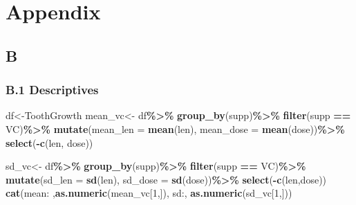 \documentclass[
]{article}
\newenvironment{Shaded}{\begin{snugshade}}{\end{snugshade}}
\newcommand{\AttributeTok}[1]{\textcolor[rgb]{0.13,0.29,0.53}{#1}}
\newcommand{\DecValTok}[1]{\textcolor[rgb]{0.00,0.00,0.81}{#1}}
\newcommand{\FunctionTok}[1]{\textcolor[rgb]{0.13,0.29,0.53}{\textbf{#1}}}
\newcommand{\NormalTok}[1]{#1}
\newcommand{\OtherTok}[1]{\textcolor[rgb]{0.56,0.35,0.01}{#1}}
\newcommand{\SpecialCharTok}[1]{\textcolor[rgb]{0.81,0.36,0.00}{\textbf{#1}}}
\newcommand{\StringTok}[1]{\textcolor[rgb]{0.31,0.60,0.02}{#1}}
\begin{document}
\section{Appendix}\label{appendix}

\subsection{B}\label{b}

\subsubsection{B.1 Descriptives}\label{b.1-descriptives}

\begin{Shaded}
\begin{Highlighting}[]
\NormalTok{df}\OtherTok{\textless{}{-}}\NormalTok{ToothGrowth}
\NormalTok{mean\_vc}\OtherTok{\textless{}{-}}
\NormalTok{    df}\SpecialCharTok{\%\textgreater{}\%}
    \FunctionTok{group\_by}\NormalTok{(supp)}\SpecialCharTok{\%\textgreater{}\%}
    \FunctionTok{filter}\NormalTok{(supp }\SpecialCharTok{==} \StringTok{\textquotesingle{}VC\textquotesingle{}}\NormalTok{)}\SpecialCharTok{\%\textgreater{}\%}
    \FunctionTok{mutate}\NormalTok{(}\AttributeTok{mean\_len =} \FunctionTok{mean}\NormalTok{(len), }\AttributeTok{mean\_dose =} \FunctionTok{mean}\NormalTok{(dose))}\SpecialCharTok{\%\textgreater{}\%}
    \FunctionTok{select}\NormalTok{(}\SpecialCharTok{{-}}\FunctionTok{c}\NormalTok{(len, dose))}

\NormalTok{sd\_vc}\OtherTok{\textless{}{-}}
\NormalTok{    df}\SpecialCharTok{\%\textgreater{}\%}
    \FunctionTok{group\_by}\NormalTok{(supp)}\SpecialCharTok{\%\textgreater{}\%}
    \FunctionTok{filter}\NormalTok{(supp }\SpecialCharTok{==} \StringTok{\textquotesingle{}VC\textquotesingle{}}\NormalTok{)}\SpecialCharTok{\%\textgreater{}\%}
    \FunctionTok{mutate}\NormalTok{(}\AttributeTok{sd\_len =} \FunctionTok{sd}\NormalTok{(len), }\AttributeTok{sd\_dose =} \FunctionTok{sd}\NormalTok{(dose))}\SpecialCharTok{\%\textgreater{}\%}
    \FunctionTok{select}\NormalTok{(}\SpecialCharTok{{-}}\FunctionTok{c}\NormalTok{(len,dose))}
\FunctionTok{cat}\NormalTok{(}\StringTok{\textquotesingle{}mean: \textquotesingle{}}\NormalTok{,}\FunctionTok{as.numeric}\NormalTok{(mean\_vc[}\DecValTok{1}\NormalTok{,]), }\StringTok{\textquotesingle{}sd:\textquotesingle{}}\NormalTok{, }\FunctionTok{as.numeric}\NormalTok{(sd\_vc[}\DecValTok{1}\NormalTok{,]))}
\end{Highlighting}
\end{Shaded}
\end{document}
